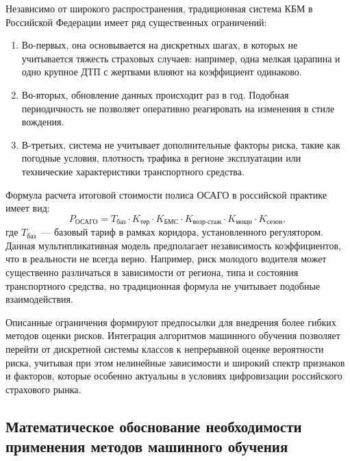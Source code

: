 Независимо от широкого распространения, традиционная система КБМ в Российской Федерации имеет ряд существенных ограничений:
\begin{enumerate}
    \item Во-первых, она основывается на дискретных шагах, в которых не учитывается тяжесть страховых случаев: например, одна мелкая царапина и одно крупное ДТП с жертвами влияют на коэффициент одинаково.
    \item Во-вторых, обновление данных происходит раз в год. Подобная периодичность не позволяет оперативно реагировать на изменения в стиле вождения.
    \item В-третьих, система не учитывает дополнительные факторы риска, такие как погодные условия, плотность трафика в регионе эксплуатации или технические характеристики транспортного средства.
\end{enumerate}

Формула расчета итоговой стоимости полиса ОСАГО в российской практике имеет вид:
\[
P_{\text{ОСАГО}} = T_{\text{баз}} \cdot K_{\text{тер}} \cdot K_{\text{БМС}} \cdot K_{\text{возр-стаж}} \cdot K_{\text{мощн}} \cdot K_{\text{сезон}},
\]
где $T_{\text{баз}}$~--- базовый тариф в рамках коридора, установленного регулятором. Данная мультипликативная модель предполагает независимость коэффициентов, что в реальности не всегда верно. Например, риск молодого водителя может существенно различаться в зависимости от региона, типа и состояния транспортного средства, но традиционная формула не учитывает подобные взаимодействия.

Описанные ограничения формируют предпосылки для внедрения более гибких методов оценки рисков. Интеграция алгоритмов машинного обучения позволяет перейти от дискретной системы классов к непрерывной оценке вероятности риска, учитывая при этом нелинейные зависимости и широкий спектр признаков и факторов, которые особенно актуальны в условиях цифровизации российского страхового рынка.

\subsection{Математическое обоснование необходимости применения методов машинного обучения}

